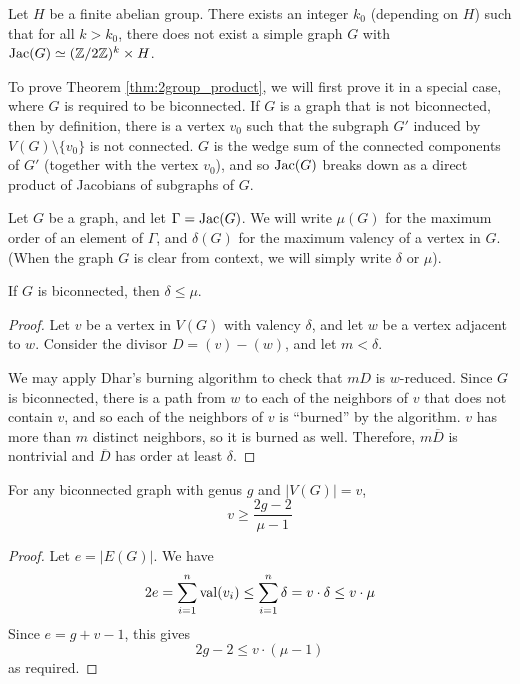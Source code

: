 \documentclass{amsart}
\begin{document}
\begin{thm}
  \label{thm:2group_product}
  Let $H$ be a finite abelian group. There exists an integer $k_0$
  (depending on $H$) such that for all $k > k_0$, there does not exist
  a simple graph $G$ with $\operatorname{Jac}(G) \simeq (\mathbb{Z}/2\mathbb{Z})^k \times H$.
\end{thm}

To prove Theorem \ref{thm:2group_product}, we will first prove it in a
special case, where $G$ is required to be biconnected. If $G$ is a
graph that is not biconnected, then by definition, there is a vertex
$v_0$ such that the subgraph $G'$ induced by $V(G) \setminus \{v_0\}$
is not connected. $G$ is the wedge sum of the connected components of
$G'$ (together with the vertex $v_0$), and so $\operatorname{Jac}(G)$ breaks down as
a direct product of Jacobians of subgraphs of $G$.

\begin{defn}
  Let $G$ be a graph, and let $\Gamma = \operatorname{Jac}(G)$. We will write $\mu(G)$
  for the maximum order of an element of $\Gamma$, and $\delta(G)$ for
  the maximum valency of a vertex in $G$. (When the graph $G$ is clear
  from context, we will simply write $\delta$ or $\mu$). 
\end{defn}

\begin{lem}
  \label{lem:delta_le_mu}
  If $G$ is biconnected, then $\delta \le \mu$.
\end{lem}
\begin{proof}
  Let $v$ be a vertex in $V(G)$ with valency $\delta$, and let $w$ be
  a vertex adjacent to $w$. Consider the divisor $D = (v) -
  (w)$, and let $m < \delta$. 

  We may apply Dhar's burning algorithm to check that $mD$ is
  $w$-reduced. Since $G$ is biconnected, there is a path from $w$ to
  each of the neighbors of $v$ that does not contain $v$, and so each
  of the neighbors of $v$ is ``burned'' by the algorithm. $v$ has more
  than $m$ distinct neighbors, so it is burned as well. Therefore,
  $m\overline{D}$ is nontrivial and $\overline{D}$ has order at least
  $\delta$.
\end{proof}

\begin{cor}
  \label{cor:genus_v_mu}
  For any biconnected graph with genus $g$ and $|V(G)| = v$,
  \begin{equation*}
    v \ge \frac{2g - 2}{\mu - 1}
  \end{equation*}
\end{cor}
\begin{proof}
  Let $e = |E(G)|$. We have 
  \begin{equation*}
    2e = \sum_{i=1}^n \operatorname{val}(v_i) \le \sum_{i=1}^n \delta = v \cdot \delta
    \le v \cdot \mu
  \end{equation*}
  Since $e = g + v - 1$, this gives
  \begin{equation*}
    2g - 2 \le v \cdot (\mu - 1)
  \end{equation*}
  as required.

\end{proof}
\end{document}
